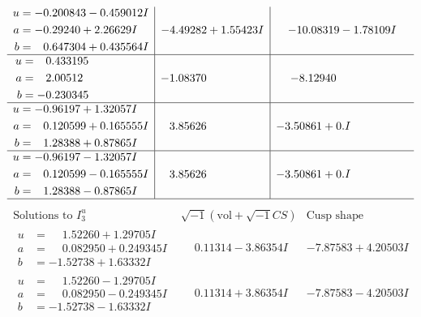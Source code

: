 \documentclass[1p]{elsarticle_modified}
\theoremstyle{definition}
\newcommand{\I}{\sqrt{-1}}
\begin{document}
$$\begin{array}{c|c|c}
\begin{aligned}
u &= -0.200843 - 0.459012 I \\
a &= -0.29240 + 2.26629 I \\
b &= \phantom{-}0.647304 + 0.435564 I\end{aligned}
 & -4.49282 + 1.55423 I & -10.08319 - 1.78109 I \\ \hline\begin{aligned}
u &= \phantom{-}0.433195\phantom{ +0.000000I} \\
a &= \phantom{-}2.00512\phantom{ +0.000000I} \\
b &= -0.230345\phantom{ +0.000000I}\end{aligned}
 & -1.08370\phantom{ +0.000000I} & -8.12940\phantom{ +0.000000I} \\ \hline\begin{aligned}
u &= -0.96197 + 1.32057 I \\
a &= \phantom{-}0.120599 + 0.165555 I \\
b &= \phantom{-}1.28388 + 0.87865 I\end{aligned}
 & \phantom{-}3.85626\phantom{ +0.000000I} & -3.50861 + 0. I\phantom{ +0.000000I} \\ \hline\begin{aligned}
u &= -0.96197 - 1.32057 I \\
a &= \phantom{-}0.120599 - 0.165555 I \\
b &= \phantom{-}1.28388 - 0.87865 I\end{aligned}
 & \phantom{-}3.85626\phantom{ +0.000000I} & -3.50861 + 0. I\phantom{ +0.000000I}\\
 \hline 
 \end{array}$$\newpage$$\begin{array}{c|c|c}  
\text{Solutions to }I^u_{3}& \I (\text{vol} + \sqrt{-1}CS) & \text{Cusp shape}\\
 \hline 
\begin{aligned}
u &= \phantom{-}1.52260 + 1.29705 I \\
a &= \phantom{-}0.082950 + 0.249345 I \\
b &= -1.52738 + 1.63332 I\end{aligned}
 & \phantom{-}0.11314 - 3.86354 I & -7.87583 + 4.20503 I \\ \hline\begin{aligned}
u &= \phantom{-}1.52260 - 1.29705 I \\
a &= \phantom{-}0.082950 - 0.249345 I \\
b &= -1.52738 - 1.63332 I\end{aligned}
 & \phantom{-}0.11314 + 3.86354 I & -7.87583 - 4.20503 I \\ \hline\begin{aligned}

\end{aligned}
\end{array}$$
\end{document}
